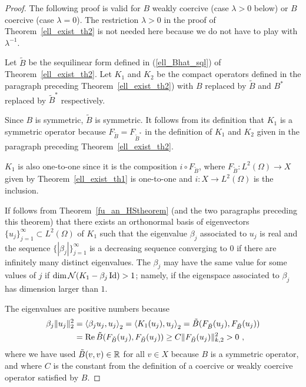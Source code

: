 \begin{proof}
The following proof is valid for $B$ weakly coercive (case $\lambda>0$
below) or $B$ coercive (case $\lambda =0$).  The restriction
$\lambda>0$ in the proof of Theorem~\ref{ell_exist_th2} is not needed
here because we do not have to play with $\displaystyle \lambda^{-1}$.

Let $\tilde{B}$ be the sequilinear form defined in (\ref{ell_Bhat_sql})
of Theorem~\ref{ell_exist_th2}.  Let $K_1$ and $K_2$ be the compact operators
defined in the paragraph preceding Theorem~\ref{ell_exist_th2}) with
$B$ replaced by $\tilde{B}$ and $\displaystyle B^\ast$ replaced by
$\displaystyle \tilde{B}^\ast$ respectively.

Since $B$ is symmetric, $\tilde{B}$ is symmetric.  It follows from its
definition that $K_1$ is a symmetric operator because
$F_{\tilde{B}} = F_{\tilde{B}^\ast}$ in the definition of $K_1$ and $K_2$
given in the paragraph preceding Theorem~\ref{ell_exist_th2}.

$K_1$ is also one-to-one since it is the composition $i \circ F_{\tilde{B}}$,
where $\displaystyle F_{\tilde{B}}:L^2(\Omega)\rightarrow X$ given by
Theorem~\ref{ell_exist_th1} is one-to-one and
$\displaystyle i:X\rightarrow L^2(\Omega)$ is the inclusion.

If follows from Theorem~\ref{fu_an_HStheorem} (and the two paragraphs
preceding this theorem) that there exists an orthonormal basis of
eigenvectors $\displaystyle \{u_j\}_{j=1}^\infty \subset L^2(\Omega)$
of $K_1$ such that the eigenvalue $\beta_j$ associated to $u_j$ is real and the
sequence $\displaystyle \{|\beta_j|\}_{j=1}^\infty$ is a decreasing sequence
converging to $0$ if there are infinitely many distinct eigenvalues.
The $\beta_j$ may have the same value for some values of $j$ if
$\dim \mathcal{N}( K_1 - \beta_j\operatorname{Id}) > 1$; namely, if the eigenspace
associated to $\beta_j$ has dimension larger than $1$.

The eigenvalues are positive numbers because
\begin{align*}
\beta_j \|u_j\|_2^2 &= \left\langle{\beta_j u_j} , {u_j}\right\rangle_2
= \left\langle{K_1(u_j)} , {u_j}\right\rangle_2 = \tilde{B}(F_{\tilde{B}}(u_j),F_{\tilde{B}}(u_j)) \\
&= \operatorname{Re} \tilde{B}(F_{\tilde{B}}(u_j),F_{\tilde{B}}(u_j))
\geq C \|F_{\tilde{B}}(u_j)\|_{k,2}^2 > 0 \ ,
\end{align*}
where we have used $\tilde{B}(v,v) \in \mathbb{R}$ for all $v \in X$
because $B$ is a symmetric operator, and where $C$ is the constant from the
definition of a coercive or weakly coercive operator satisfied by $B$.


\end{proof}
